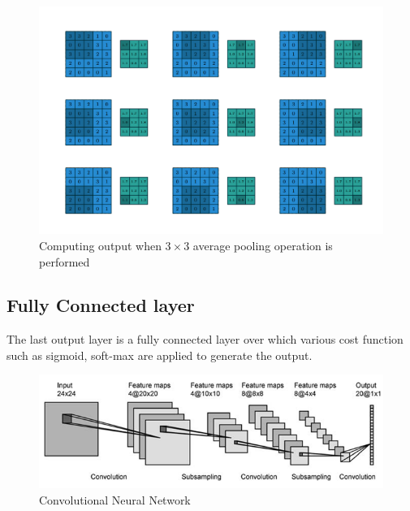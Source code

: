 \begin{figure}[H]
  \centering
    \includegraphics[scale=.3, angle=0]{Files/Pooling.png}
    \caption[Pooling Operation]{Computing output when $3 \times 3$ average pooling operation is performed \cite{1603.07285}}
    \label{fig:Pooling}
\end{figure}

\subsection{Fully Connected layer}
The last output layer is a fully connected layer over which various cost function such as sigmoid, soft-max are applied to generate the output.


\begin{figure}[H]
  \centering
    \includegraphics[scale=.6, angle=0]{Files/cnn-2.png}
    \caption[Convolutional Neural Network]{Convolutional Neural Network}
    \label{fig:CNN}
\end{figure}